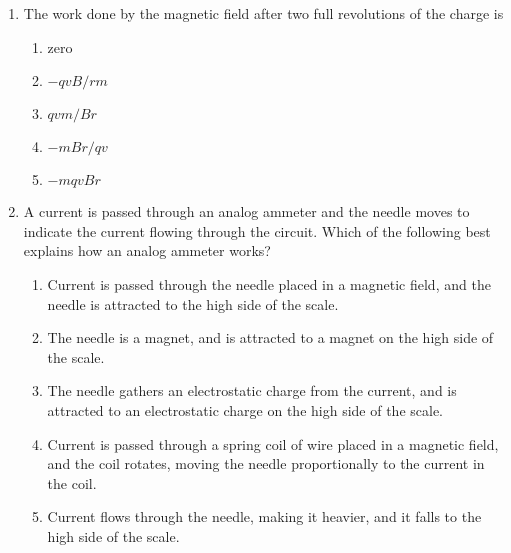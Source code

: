 \documentclass{../../../oss-classkick}
\begin{document}
\begin{multicols}{2}
\begin{enumerate}[leftmargin=18pt,resume]
  \item The work done by the magnetic field after two full revolutions of the
    charge is
    \begin{enumerate}[nosep,leftmargin=18pt,label=(\Alph*)]
    \item zero
    \item $-qvB/rm$
    \item $qvm/Br$
    \item $-mBr/qv$
    \item $-mqvBr$
    \end{enumerate}
    \label{q:circ2}
    \columnbreak
    

  \item A current is passed through an analog ammeter and the needle moves
    to indicate the current flowing through the circuit. Which of the
    following best explains how an analog ammeter works?
    \begin{enumerate}[nosep,leftmargin=18pt,label=(\Alph*)]
    \item Current is passed through the needle placed in a magnetic field,
      and the needle is attracted to the high side of the scale.
    \item The needle is a magnet, and is attracted to a magnet on the high
      side of the scale.
    \item The needle gathers an electrostatic charge from the current, and is
      attracted to an electrostatic charge on the high side of the scale.
    \item Current is passed through a spring coil of wire placed in a
      magnetic field, and the coil rotates, moving the needle
      proportionally to the current in the coil.
    \item Current flows through the needle, making it heavier, and it falls to
      the high side of the scale.
    \end{enumerate}
    \vspace{.7in}
    

\end{enumerate}
\end{multicols}
\end{document}
